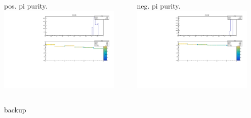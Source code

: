 \documentclass[aspectratio=169,xcolor=dvipsnames]{beamer}
\begin{document}
\begin{frame}
  \begin{columns}
    \begin{column}[T]{0.5\textwidth}
      pos. pi purity.
      \includegraphics[width = 0.9\textwidth]{results/pid/SHMS_pi_purity_6194.pdf}
\end{column}
\begin{column}[T]{0.5\textwidth}
  neg. pi purity.
  \includegraphics[width = 0.9\textwidth]{results/pid/SHMS_pi_purity_6245.pdf}
\end{column}
\end{columns}
\end{frame}
\begin{frame}
  backup
\end{frame}
\end{document}
